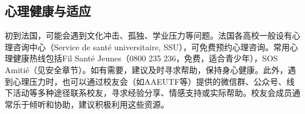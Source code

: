 \subsection{心理健康与适应}

初到法国，可能会遇到文化冲击、孤独、学业压力等问题。法国各高校一般设有心理咨询中心（Service de santé universitaire, SSU），可免费预约心理咨询。常用心理健康热线包括Fil Santé Jeunes（0800 235 236，免费，适合青少年），SOS Amitié（见安全章节）。如有需要，建议及时寻求帮助，保持身心健康。此外，遇到心理压力时，也可以通过校友会（如AAEUTF等）提供的微信群、公众号、线下活动等多种途径联系校友，寻求经验分享、情感支持或实际帮助。校友会成员通常乐于倾听和协助，建议积极利用这些资源。
